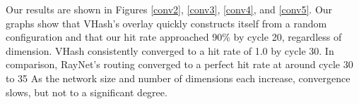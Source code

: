 \documentclass[10pt, conference, letterpaper]{IEEEtran}
\begin{document}
Our results are shown in Figures \ref{conv2}, \ref{conv3}, \ref{conv4}, and \ref{conv5}.
Our graphs show that VHash's overlay quickly constructs itself from a random configuration and that our hit rate approached 90\% by cycle 20, regardless of dimension.
VHash consistently converged to a hit rate of 1.0 by cycle 30. 
In comparison, RayNet's routing converged to a perfect hit rate at around cycle 30 to 35 \cite{raynet} 
As the network size and number of dimensions each increase, convergence slows, but not to a significant degree.
 
\end{document}
